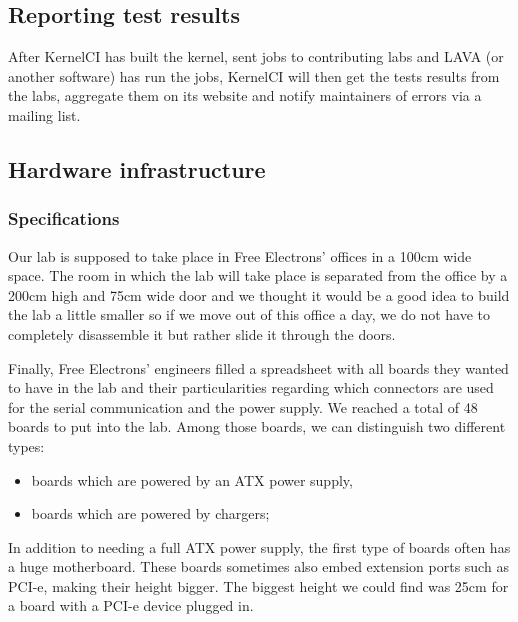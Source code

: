 \subsection{Reporting test results}

After KernelCI has built the kernel, sent jobs to contributing labs and LAVA (or another software) has run the jobs, KernelCI will then get the tests results from the labs, aggregate them on its website and notify maintainers of errors via a mailing list.

\subsection{Hardware infrastructure}

\subsubsection{Specifications}

Our lab is supposed to take place in Free Electrons' offices in a 100cm wide space. The room in which the lab will take place is separated from the office by a 200cm high and 75cm wide door and we thought it would be a good idea to build the lab a little smaller so if we move out of this office a day, we do not have to completely disassemble it but rather slide it through the doors.

Finally, Free Electrons' engineers filled a spreadsheet with all boards they wanted to have in the lab and their particularities regarding which connectors are used for the serial communication and the power supply. We reached a total of 48 boards to put into the lab. Among those boards, we can distinguish two different types:
\begin{itemize}
  \item boards which are powered by an ATX power supply,
  \item boards which are powered by chargers;
\end{itemize}

In addition to needing a full ATX power supply, the first type of boards often has a huge motherboard. These boards sometimes also embed extension ports such as PCI-e, making their height bigger. The biggest height we could find was 25cm for a board with a PCI-e device plugged in.

